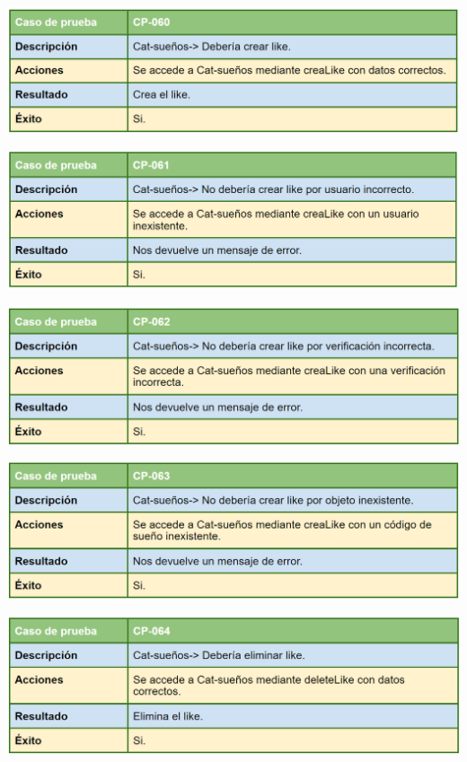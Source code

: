 \bigskip

\includegraphics[width=\textwidth]{img/cap7/cp-060.png}

\bigskip

\includegraphics[width=\textwidth]{img/cap7/cp-061.png}

\bigskip

\includegraphics[width=\textwidth]{img/cap7/cp-062.png}

\bigskip

\includegraphics[width=\textwidth]{img/cap7/cp-063.png}

\bigskip

\includegraphics[width=\textwidth]{img/cap7/cp-064.png}

